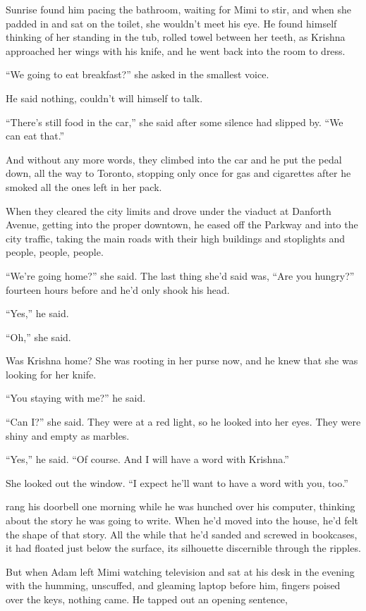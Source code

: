 Sunrise found him pacing the bathroom, waiting for Mimi to stir, and
when she padded in and sat on the toilet, she wouldn't meet his eye. 
He found himself thinking of her standing in the tub, rolled towel
between her teeth, as Krishna approached her wings with his knife, and
he went back into the room to dress.

``We going to eat breakfast?'' she asked in the smallest voice.

He said nothing, couldn't will himself to talk.

``There's still food in the car,'' she said after some silence had
slipped by.  ``We can eat that.''

And without any more words, they climbed into the car and he put the
pedal down, all the way to Toronto, stopping only once for gas and
cigarettes after he smoked all the ones left in her pack.

When they cleared the city limits and drove under the viaduct at
Danforth Avenue, getting into the proper downtown, he eased off the
Parkway and into the city traffic, taking the main roads with their
high buildings and stoplights and people, people, people.

``We're going home?'' she said.  The last thing she'd said was, ``Are
you hungry?'' fourteen hours before and he'd only shook his head.

``Yes,'' he said.

``Oh,'' she said.

Was Krishna home?  She was rooting in her purse now, and he knew that
she was looking for her knife.

``You staying with me?'' he said.

``Can I?'' she said.  They were at a red light, so he looked into her
eyes.  They were shiny and empty as marbles.

``Yes,'' he said.  ``Of course.  And I will have a word with
Krishna.''

She looked out the window.  ``I expect he'll want to have a word with
you, too.''

 rang his doorbell one morning while he was hunched over his
computer, thinking about the story he was going to write.  When he'd
moved into the house, he'd felt the shape of that story.  All the
while that he'd sanded and screwed in bookcases, it had floated just
below the surface, its silhouette discernible through the ripples.

But when Adam left Mimi watching television and sat at his desk in the
evening with the humming, unscuffed, and gleaming laptop before him,
fingers poised over the keys, nothing came.  He tapped out an opening
sentence,

